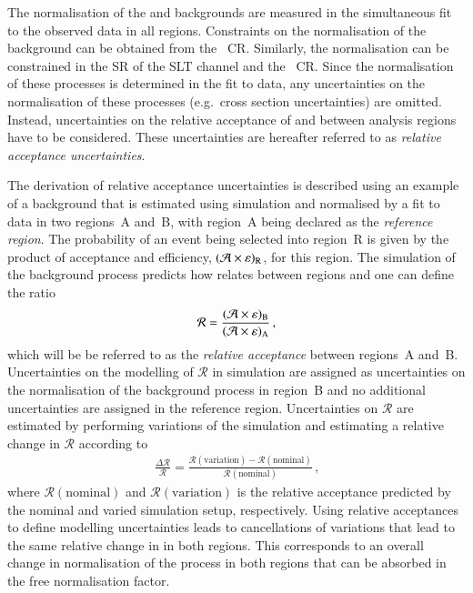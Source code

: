 The normalisation of the \ZHF and \ttbar backgrounds are measured in the
simultaneous fit to the observed data in all regions. Constraints on the
normalisation of the \ZHF background can be obtained from the
\ZHF~CR. Similarly, the \ttbar normalisation can be constrained in the SR of the
\lephad SLT channel and the \ZHF~CR. Since the normalisation of these processes
is determined in the fit to data, any uncertainties on the normalisation of
these processes (e.g.~cross section uncertainties) are omitted. Instead,
uncertainties on the relative acceptance of \ZHF and \ttbar between analysis
regions have to be considered. These uncertainties are hereafter referred to as
\emph{relative acceptance uncertainties}.

The derivation of relative acceptance uncertainties is described using an
example of a background that is estimated using simulation and normalised by a
fit to data in two regions~A and~B, with region~A being declared as the
\emph{reference region}. The probability of an event being selected into
region~R is given by the product of acceptance and efficiency,
$(\mathcal{A} \times \varepsilon)_{\text{R}}$, for this region. The simulation of the background
process predicts how \AccTimesEff relates between regions and one can define the
ratio
\begin{align*}
  \mathcal{R} = \frac{(\mathcal{A} \times \varepsilon)_{\text{B}}}{(\mathcal{A} \times \varepsilon)_{\text{A}}} \,\text{,}
\end{align*}
which will be be referred to as the \emph{relative acceptance} between regions~A
and~B. Uncertainties on the modelling of $\mathcal{R}$ in simulation are
assigned as uncertainties on the normalisation of the background process in
region~B and no additional uncertainties are assigned in the reference
region. Uncertainties on $\mathcal{R}$ are estimated by performing variations of
the simulation and estimating a relative change in $\mathcal{R}$ according to
\begin{align}
  \frac{\Delta \mathcal{R}}{\mathcal{R}} = \frac{\mathcal{R}(\text{variation}) - \mathcal{R}(\text{nominal})}{\mathcal{R}(\text{nominal})} \,\text{,}
  \label{eq:relative_acceptance_uncertainty}
\end{align}
where $\mathcal{R}(\text{nominal})$ and $\mathcal{R}(\text{variation})$ is the
relative acceptance predicted by the nominal and varied simulation setup,
respectively. Using relative acceptances to define modelling uncertainties leads
to cancellations of variations that lead to the same relative change in
\AccTimesEff in both regions. This corresponds to an overall change in
normalisation of the process in both regions that can be absorbed in the free
normalisation factor.

